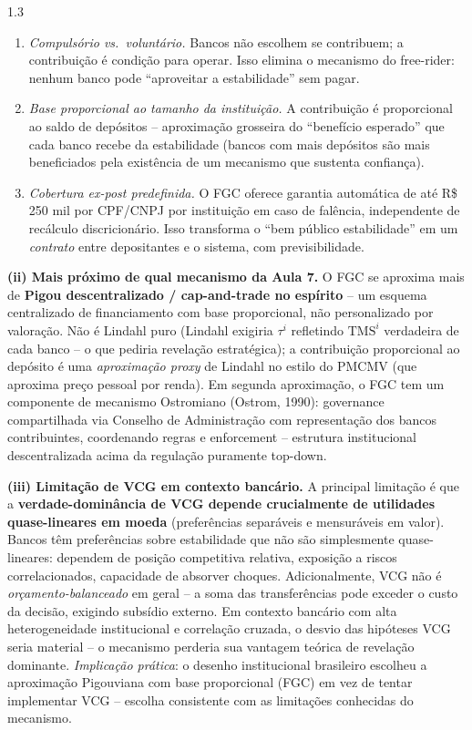 \documentclass[11pt,addpoints]{exam}
\newcommand{\TMS}{\text{TMS}}
\begin{document}
\begin{spacing}{1.3}
\begin{questions}
\begin{parts}
\begin{solution}
\begin{enumerate}[noitemsep,topsep=0pt,leftmargin=*]
    \item \emph{Compulsório vs.\ voluntário.} Bancos não escolhem se contribuem; a contribuição é condição para operar. Isso elimina o mecanismo do free-rider: nenhum banco pode ``aproveitar a estabilidade'' sem pagar.
    \item \emph{Base proporcional ao tamanho da instituição.} A contribuição é proporcional ao saldo de depósitos -- aproximação grosseira do ``benefício esperado'' que cada banco recebe da estabilidade (bancos com mais depósitos são mais beneficiados pela existência de um mecanismo que sustenta confiança).
    \item \emph{Cobertura ex-post predefinida.} O FGC oferece garantia automática de até R\$ 250 mil por CPF/CNPJ por instituição em caso de falência, independente de recálculo discricionário. Isso transforma o ``bem público estabilidade'' em um \emph{contrato} entre depositantes e o sistema, com previsibilidade.
\end{enumerate}

\textbf{(ii) Mais próximo de qual mecanismo da Aula 7.} O FGC se aproxima mais de \textbf{Pigou descentralizado / cap-and-trade no espírito} -- um esquema centralizado de financiamento com base proporcional, não personalizado por valoração. Não é Lindahl puro (Lindahl exigiria $\tau^i$ refletindo $\TMS^i$ verdadeira de cada banco -- o que pediria revelação estratégica); a contribuição proporcional ao depósito é uma \emph{aproximação proxy} de Lindahl no estilo do PMCMV (que aproxima preço pessoal por renda). Em segunda aproximação, o FGC tem um componente de mecanismo Ostromiano (Ostrom, 1990): governance compartilhada via Conselho de Administração com representação dos bancos contribuintes, coordenando regras e enforcement -- estrutura institucional descentralizada acima da regulação puramente top-down.

\textbf{(iii) Limitação de VCG em contexto bancário.} A principal limitação é que a \textbf{verdade-dominância de VCG depende crucialmente de utilidades quase-lineares em moeda} (preferências separáveis e mensuráveis em valor). Bancos têm preferências sobre estabilidade que não são simplesmente quase-lineares: dependem de posição competitiva relativa, exposição a riscos correlacionados, capacidade de absorver choques. Adicionalmente, VCG não é \emph{orçamento-balanceado} em geral -- a soma das transferências pode exceder o custo da decisão, exigindo subsídio externo. Em contexto bancário com alta heterogeneidade institucional e correlação cruzada, o desvio das hipóteses VCG seria material -- o mecanismo perderia sua vantagem teórica de revelação dominante. \emph{Implicação prática}: o desenho institucional brasileiro escolheu a aproximação Pigouviana com base proporcional (FGC) em vez de tentar implementar VCG -- escolha consistente com as limitações conhecidas do mecanismo.


\end{solution}
\end{parts}
\end{questions}
\end{spacing}
\end{document}

